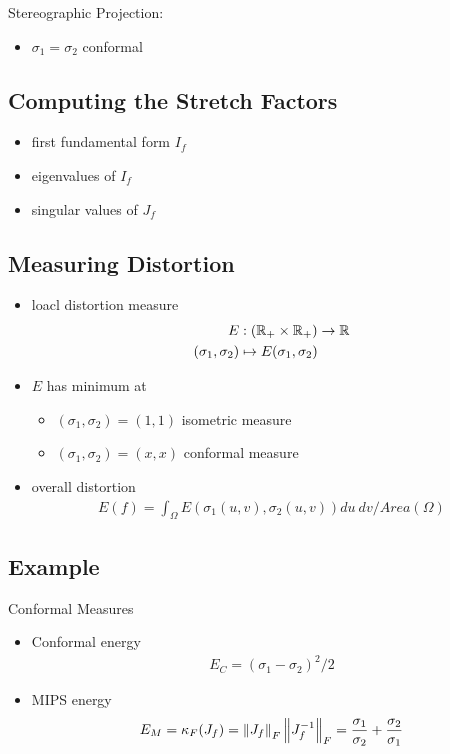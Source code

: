 Stereographic Projection:
\begin{itemize}
    \item $\sigma_1=\sigma_2$ conformal
\end{itemize}

\subsection{Computing the Stretch Factors}
\begin{itemize}%
    \item first fundamental form $I_f$
    \item eigenvalues of $I_f$
    \item singular values of $J_f$
\end{itemize}

\subsection{Measuring Distortion}
\begin{itemize}
    \item loacl distortion measure
    \begin{align*}
        E&:(\mathbb{R}_+\times \mathbb{R}_+)\to \mathbb{R}\\
        (\sigma_1, \sigma_2)&\mapsto E(\sigma_1, \sigma_2)
    \end{align*}
    \item $E$ has minimum at 
    \begin{itemize}
        \item $(\sigma_1, \sigma_2)=(1,1)$ isometric measure
        \item $(\sigma_1, \sigma_2)=(x,x)$ conformal measure
    \end{itemize}
    \item overall distortion
    \begin{align*}
        E(f)=\int_{\Omega}E(\sigma_1(u,v),\sigma_2(u,v))du\ dv\bigg/ Area(\Omega)
    \end{align*}
\end{itemize}

\subsection{Example}%

Conformal Measures
\begin{itemize}
    \item Conformal energy
    \begin{align*}
        E_C=(\sigma_1-\sigma_2)^2/2
    \end{align*}
    \item MIPS energy
    \begin{align*}
        E_M=\kappa_F(J_f)=\left\lVert J_f\right\rVert_F\left\lVert J_f^{-1}\right\rVert_F=\frac{\sigma_1}{\sigma_2}+\frac{\sigma_2}{\sigma_1}
    \end{align*}
\end{itemize}

